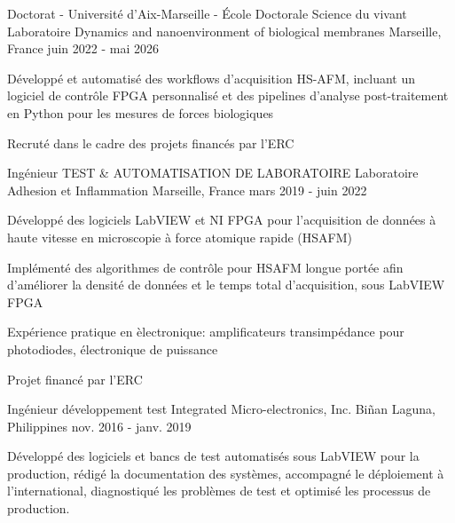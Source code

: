 
\begin{cventries}
  \cventry
  {Doctorat - Universit\'e d'Aix-Marseille - \'Ecole Doctorale Science du vivant }
  {Laboratoire Dynamics and nanoenvironment of biological membranes }
  {Marseille, France}
  {juin 2022 - mai 2026}
  {
    \begin{cvitems}
      \item {D\'evelopp\'e et automatis\'e des workflows d'acquisition HS-AFM, incluant un logiciel de contr\^ole FPGA personnalis\'e et des pipelines d'analyse post-traitement en Python pour les mesures de forces biologiques}
      \item {Recrut\'e dans le cadre des projets financ\'es par l'ERC }
    \end{cvitems}
    \vspace{1em}
  }

  \cventry
  {Ing\'enieur TEST \& AUTOMATISATION DE LABORATOIRE}
  {Laboratoire Adhesion et Inflammation }
  {Marseille, France}
  {mars 2019 - juin 2022}
  {
    \begin{cvitems}
      \item{D\'evelopp\'e des logiciels LabVIEW et NI FPGA pour l'acquisition de donn\'ees \`a haute vitesse en microscopie \`a force atomique rapide (HSAFM)}
      \item {Impl\'ement\'e des algorithmes de contr\^ole pour HSAFM longue port\'ee afin d'am\'eliorer la densit\'e de donn\'ees et le temps total d'acquisition, sous LabVIEW FPGA}
      \item {Exp\'erience pratique en \`electronique: amplificateurs transimp\'edance pour photodiodes, \'electronique de puissance}
      \item {Projet financ\'e par l'ERC }
    \end{cvitems}
    \vspace{1em}
  }

  \cventry
  {Ing\'enieur d\'eveloppement test}
  {Integrated Micro-electronics, Inc. }
  {Bi\~nan Laguna, Philippines}
  {nov. 2016 - janv. 2019}
  {
    \begin{cvitems}
      \item{D\'evelopp\'e des logiciels et bancs de test automatis\'es sous LabVIEW pour la production, r\'edig\'e la documentation des syst\`emes, accompagn\'e le d\'eploiement \`a l'international, diagnostiqu\'e les probl\`emes de test et optimis\'e les processus de production.}
    \end{cvitems}
    \vspace{1em}
  }


\end{cventries}

